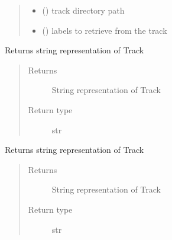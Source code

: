 \documentclass[letterpaper,10pt,english,openany,oneside]{sphinxmanual}
\begin{document}
\begin{fulllineitems}
\begin{fulllineitems}
\begin{quote}
\begin{description}
\begin{itemize}
\item {} 
 () \textendash{} track directory path

\item {} 
 () \textendash{} labels to retrieve from the track

\end{itemize}

\end{description}\end{quote}

\end{fulllineitems}


\begin{fulllineitems}
\label{\detokenize{docs/source/preprocess:preprocess.track_classes.Track.__repr__}}
Returns string representation of Track
\begin{quote}\begin{description}
\item[{Returns}] \leavevmode
String representation of Track

\item[{Return type}] \leavevmode
str

\end{description}\end{quote}

\end{fulllineitems}


\begin{fulllineitems}
\label{\detokenize{docs/source/preprocess:preprocess.track_classes.Track.__str__}}
Returns string representation of Track
\begin{quote}\begin{description}
\item[{Returns}] \leavevmode
String representation of Track

\item[{Return type}] \leavevmode
str


\end{description}
\end{quote}
\end{fulllineitems}
\end{fulllineitems}
\end{document}
